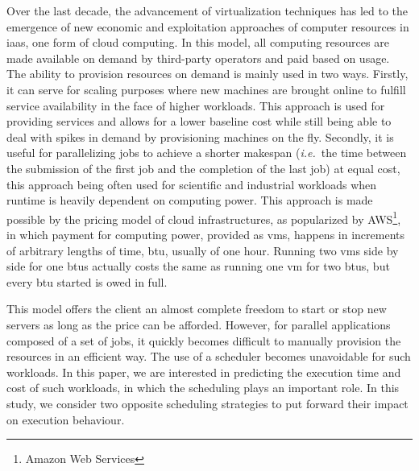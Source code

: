 \documentclass[10pt,conference,compsocconf]{IEEEtran}
\begin{document}
Over the  last decade, the advancement  of virtualization techniques has  led to
the emergence of new economic  and exploitation approaches of computer resources
in  \ac{iaas},  one form  of cloud  computing. In  this model,  all
computing resources  are made available  on demand by third-party  operators and
paid based  on usage.  The  ability to provision  resources on demand  is mainly
used in two ways.  Firstly, it can serve for scaling purposes where new machines
are  brought online  to  fulfill  service availability  in  the  face of higher 
workloads.  This approach  is used  for  providing services  and allows  for a  lower
baseline  cost  while  still  being  able  to deal  with  spikes  in  demand  by
provisioning machines on the fly. Secondly, it is useful for parallelizing jobs
to achieve a shorter makespan (\textit{i.e.}\ the time between the submission of the first
job and the completion of the  last job)  at equal  cost, this  approach being  often used  for
scientific  and  industrial  workloads  when runtime  is  heavily  dependent  on
computing power.  This  approach is made possible by the  pricing model of cloud
infrastructures, as  popularized by AWS\footnote{Amazon Web  Services}, in which
payment  for computing  power, provided  as \acp{vm},  happens in  increments of
arbitrary lengths  of time, \ac{btu}, usually  of one hour. Running  two \acp{vm}
side by side for one \acp{btu} actually costs the same as running one \ac{vm} for two
\acp{btu}, but every \ac{btu} started is owed in full.

This model  offers the client  an almost complete freedom  to start or  stop new
servers as long as the price can be afforded. However, for parallel applications composed
of a set of jobs, it  quickly  becomes  difficult  to manually  provision  the
resources in an  efficient way.  The use of a  scheduler becomes unavoidable for
such workloads.   In this paper, we  are interested in predicting  the execution
time  and cost  of such  workloads, in  which the  scheduling plays  an
important role.  In  this study, we consider two  opposite scheduling strategies
to put forward their impact on execution behaviour.
\end{document}
